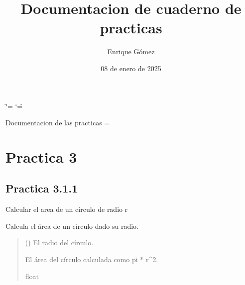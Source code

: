 \documentclass[letterpaper,10pt,spanish]{sphinxmanual}
\title{Documentacion de cuaderno de practicas}
\date{08 de enero de 2025}
\author{Enrique Gómez}
\begin{document}
\ifdefined\shorthandoff
  \ifnum\catcode`\=\string=\active\shorthandoff{=}\fi
  \ifnum\catcode`\"=\active{}\fi
\fi

\pagestyle{empty}
\sphinxmaketitle
\pagestyle{plain}
\sphinxtableofcontents
\pagestyle{normal}
\label{\detokenize{index::doc}}


\sphinxstepscope

\sphinxAtStartPar
Documentacion de las practicas
=

\sphinxstepscope


\chapter{Practica 3}
\label{\detokenize{pr3:practica-3}}\label{\detokenize{pr3::doc}}\label{\detokenize{pr3::doc}}

\section{Practica 3.1.1}
\label{\detokenize{pr3:module-pr3.1_1}}\label{\detokenize{pr3:practica-3-1-1}}
\sphinxAtStartPar
Calcular el area de un circulo de radio r

\begin{fulllineitems}
\label{\detokenize{pr3:pr3.1_1.area_circulo}}
\pysigstartsignatures
{}
\pysigstopsignatures
\sphinxAtStartPar
Calcula el área de un círculo dado su radio.
\begin{quote}\begin{description}
\sphinxAtStartPar
{} () \textendash{} El radio del círculo.

\sphinxAtStartPar
El área del círculo calculada como pi * r\textasciicircum{}2.

\sphinxAtStartPar
float

\end{description}\end{quote}

\end{fulllineitems}
\end{document}
